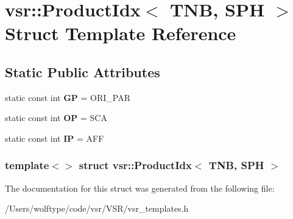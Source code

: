 \hypertarget{structvsr_1_1_product_idx_3_01_t_n_b_00_01_s_p_h_01_4}{\section{vsr\-:\-:Product\-Idx$<$ T\-N\-B, S\-P\-H $>$ Struct Template Reference}
\label{structvsr_1_1_product_idx_3_01_t_n_b_00_01_s_p_h_01_4}
}
\subsection*{Static Public Attributes}
\begin{DoxyCompactItemize}
\item 
\hypertarget{structvsr_1_1_product_idx_3_01_t_n_b_00_01_s_p_h_01_4_a04d20b243ea73a5b3066a2c255fc2641}{static const int {\bfseries G\-P} = O\-R\-I\-\_\-\-P\-A\-R}\label{structvsr_1_1_product_idx_3_01_t_n_b_00_01_s_p_h_01_4_a04d20b243ea73a5b3066a2c255fc2641}

\item 
\hypertarget{structvsr_1_1_product_idx_3_01_t_n_b_00_01_s_p_h_01_4_aa00a073a6f4d75622ab568e400a9117e}{static const int {\bfseries O\-P} = S\-C\-A}\label{structvsr_1_1_product_idx_3_01_t_n_b_00_01_s_p_h_01_4_aa00a073a6f4d75622ab568e400a9117e}

\item 
\hypertarget{structvsr_1_1_product_idx_3_01_t_n_b_00_01_s_p_h_01_4_ad10293b587f138971fd860f59d3f0eed}{static const int {\bfseries I\-P} = A\-F\-F}\label{structvsr_1_1_product_idx_3_01_t_n_b_00_01_s_p_h_01_4_ad10293b587f138971fd860f59d3f0eed}

\end{DoxyCompactItemize}
\subsubsection*{template$<$$>$ struct vsr\-::\-Product\-Idx$<$ T\-N\-B, S\-P\-H $>$}



The documentation for this struct was generated from the following file\-:\begin{DoxyCompactItemize}
\item 
/\-Users/wolftype/code/vsr/\-V\-S\-R/vsr\-\_\-templates.\-h\end{DoxyCompactItemize}
